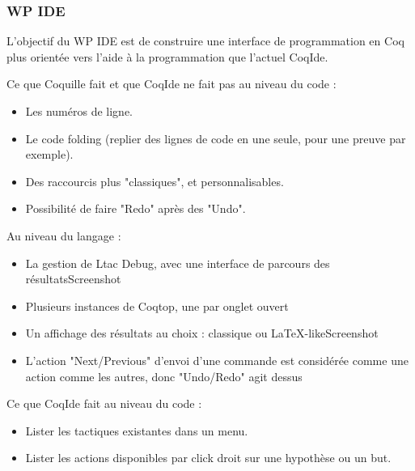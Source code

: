 \begin{frame}
\frametitle{WP IDE} 
L'objectif du WP IDE est de construire une interface de programmation en Coq plus orientée vers l'aide à la programmation que l'actuel CoqIde.
\end{frame}

\begin{frame}
Ce que Coquille fait et que CoqIde ne fait pas au niveau du code :
\begin{itemize}
    \item Les numéros de ligne.
    \item Le code folding (replier des lignes de code en une seule, pour une preuve par exemple).
    \item Des raccourcis plus "classiques", et personnalisables.
    \item Possibilité de faire "Redo" après des "Undo".
\end{itemize}
\end{frame}

\begin{frame}

Au niveau du langage :
\begin{itemize}
    \item La gestion de Ltac Debug, avec une interface de parcours des résultatsScreenshot
    \item Plusieurs instances de Coqtop, une par onglet ouvert
    \item Un affichage des résultats au choix : classique ou LaTeX-likeScreenshot
    \item L'action "Next/Previous" d'envoi d'une commande est considérée comme une action comme les autres, donc "Undo/Redo" agit dessus
\end{itemize}
 
\end{frame}

\begin{frame}

Ce que CoqIde fait au niveau du code :

\begin{itemize}
    \item Lister les tactiques existantes dans un menu.
    \item Lister les actions disponibles par click droit sur une hypothèse ou un but.
\end{itemize}



\end{frame}


